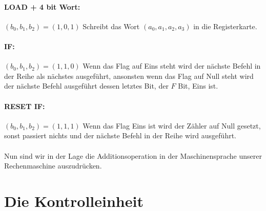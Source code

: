 \documentclass[11pt,a4paper,leqno]{report}
\numberwithin{equation}{chapter}
\begin{document}
\paragraph{LOAD + 4 bit Wort:} $(b_0, b_1, b_2) = (1, 0, 1)$ Schreibt das Wort $(a_0, a_1, a_2, a_3)$ in die Registerkarte.
\paragraph{IF:} $(b_0, b_1, b_2) = (1, 1, 0)$ Wenn das Flag auf Eins steht wird der n\"achste Befehl in der Reihe als n\"achstes ausgef\"uhrt, ansonsten wenn das Flag auf Null steht wird der n\"achste Befehl ausgef\"uhrt dessen letztes Bit, der $F$ Bit, Eins ist.
\paragraph{RESET IF:} $(b_0, b_1, b_2) = (1, 1, 1)$ Wenn das Flag Eins ist wird der Z\"ahler auf Null gesetzt, sonst passiert nichts und der n\"achste Befehl in der Reihe wird ausgef\"uhrt.
\\
\\
Nun sind wir in der Lage die Additionsoperation in der Maschinensprache unserer Rechenmaschine auszudr\"ucken.

\section{Die Kontrolleinheit}
\end{document}
